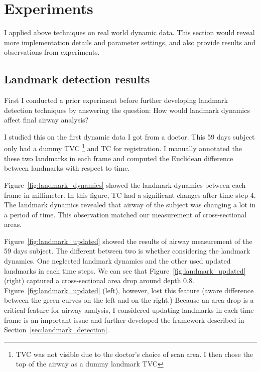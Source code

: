 \section{Experiments}
\label{sec:experiments}
I applied above techniques on real world dynamic data.
This section would reveal more implementation details and parameter settings, and also provide results and observations from experiments.

\subsection{Landmark detection results}
\label{sec:landmark_detection_results}
First I conducted a prior experiment before further developing landmark detection techniques by answering the question: How would landmark dynamics affect final airway analysis?

I studied this on the first dynamic data I got from a doctor.
This 59 days subject only had a dummy TVC \footnote{TVC was not visible due to the doctor's choice of scan area. I then chose the top of the airway as a dummy landmark TVC} and TC for registration.
I manually annotated the these two landmarks in each frame and computed the Euclidean difference between landmarks with respect to time.

Figure~\ref{fig:landmark_dynamics} showed the landmark dynamics between each frame in millimeter.
In this figure, TC had a significant changes after time step 4.
The landmark dynamics revealed that airway of the subject was changing a lot in a period of time.
This observation matched our measurement of cross-sectional areas.

Figure~\ref{fig:landmark_updated} showed the results of airway measurement of the 59 days subject.
The different between two is whether considering the landmark dynamics.
One neglected landmark dynamics and the other used updated landmarks in each time steps.
We can see that Figure~\ref{fig:landmark_updated} (right) captured a cross-sectional area drop around depth 0.8.
Figure~\ref{fig:landmark_updated} (left), however, lost this feature (aware difference between the green curves on the left and on the right.)
Because an area drop is a critical feature for airway analysis, I considered updating landmarks in each time frame is an important issue and further developed the framework described in Section~\ref{sec:landmark_detection}.

